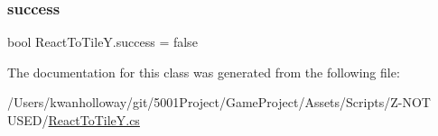 \subsubsection{\texorpdfstring{success}{success}}
{\footnotesize\ttfamily bool React\+To\+Tile\+Y.\+success = false}



The documentation for this class was generated from the following file\+:\begin{DoxyCompactItemize}
\item 
/\+Users/kwanholloway/git/5001\+Project/\+Game\+Project/\+Assets/\+Scripts/\+Z-\/\+N\+O\+T U\+S\+E\+D/\hyperlink{_react_to_tile_y_8cs}{React\+To\+Tile\+Y.\+cs}\end{DoxyCompactItemize}
